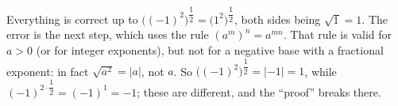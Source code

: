 Everything is correct up to $\bigl((-1)^2\bigr)^{\dfrac{1}{2}}=\bigl(1^2\bigr)^{\dfrac{1}{2}}$, both sides being $\sqrt1=1$. The error is the next step, which uses the rule $(a^m)^n=a^{mn}$. That rule is valid for $a>0$ (or for integer exponents), but not for a negative base with a fractional exponent: in fact $\sqrt{a^2}=|a|$, not $a$. So $\bigl((-1)^2\bigr)^{\dfrac{1}{2}}=|-1|=1$, while $(-1)^{2\cdot\dfrac{1}{2}}=(-1)^1=-1$; these are different, and the ``proof'' breaks there.
